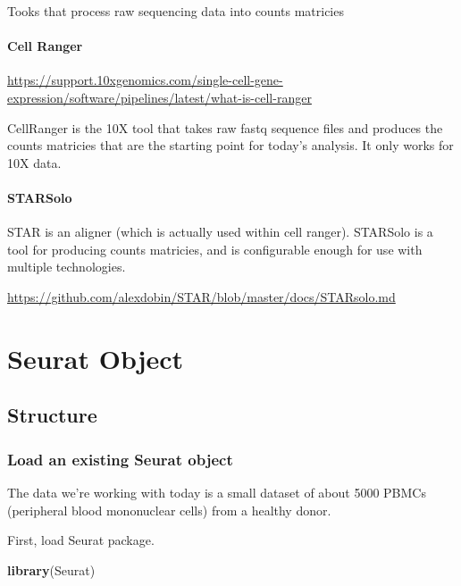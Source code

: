 \documentclass[
]{book}
\newenvironment{Shaded}{\begin{snugshade}}{\end{snugshade}}
\newcommand{\FunctionTok}[1]{\textcolor[rgb]{0.13,0.29,0.53}{\textbf{#1}}}
\newcommand{\NormalTok}[1]{#1}
\begin{document}
Tooks that process raw sequencing data into counts matricies

\subsection*{Cell Ranger}\label{cell-ranger}

\url{https://support.10xgenomics.com/single-cell-gene-expression/software/pipelines/latest/what-is-cell-ranger}

CellRanger is the 10X tool that takes raw fastq sequence files and produces the counts matricies that are the starting point for today's analysis. It only works for 10X data.

\subsection*{STARSolo}\label{starsolo}

STAR is an aligner (which is actually used within cell ranger). STARSolo is a tool for producing counts matricies, and is configurable enough for use with multiple technologies.

\url{https://github.com/alexdobin/STAR/blob/master/docs/STARsolo.md}

\part{Seurat Object}\label{part-seurat-object}

\chapter{Structure}\label{structure}

\section{Load an existing Seurat object}\label{load-an-existing-seurat-object}

The data we're working with today is a small dataset of about 5000 PBMCs (peripheral blood mononuclear cells) from a healthy donor.

First, load Seurat package.

\begin{Shaded}
\begin{Highlighting}[]
\FunctionTok{library}\NormalTok{(Seurat)}
\end{Highlighting}
\end{Shaded}
\end{document}
